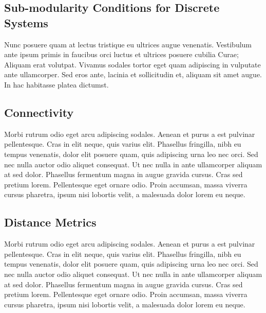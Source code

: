 \subsection{Sub-modularity Conditions for Discrete Systems}

Nunc posuere quam at lectus tristique eu ultrices augue venenatis. Vestibulum ante ipsum primis in faucibus orci luctus et ultrices posuere cubilia Curae; Aliquam erat volutpat. Vivamus sodales tortor eget quam adipiscing in vulputate ante ullamcorper. Sed eros ante, lacinia et sollicitudin et, aliquam sit amet augue. In hac habitasse platea dictumst.


\subsection{Connectivity}
Morbi rutrum odio eget arcu adipiscing sodales. Aenean et purus a est pulvinar pellentesque. Cras in elit neque, quis varius elit. Phasellus fringilla, nibh eu tempus venenatis, dolor elit posuere quam, quis adipiscing urna leo nec orci. Sed nec nulla auctor odio aliquet consequat. Ut nec nulla in ante ullamcorper aliquam at sed dolor. Phasellus fermentum magna in augue gravida cursus. Cras sed pretium lorem. Pellentesque eget ornare odio. Proin accumsan, massa viverra cursus pharetra, ipsum nisi lobortis velit, a malesuada dolor lorem eu neque.


\subsection{Distance Metrics}
Morbi rutrum odio eget arcu adipiscing sodales. Aenean et purus a est pulvinar pellentesque. Cras in elit neque, quis varius elit. Phasellus fringilla, nibh eu tempus venenatis, dolor elit posuere quam, quis adipiscing urna leo nec orci. Sed nec nulla auctor odio aliquet consequat. Ut nec nulla in ante ullamcorper aliquam at sed dolor. Phasellus fermentum magna in augue gravida cursus. Cras sed pretium lorem. Pellentesque eget ornare odio. Proin accumsan, massa viverra cursus pharetra, ipsum nisi lobortis velit, a malesuada dolor lorem eu neque.


